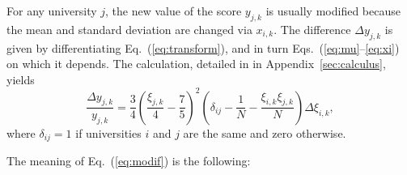 \documentclass[twocolumn]{article}
\def\eqref#1{Eq.~(\ref{eq:#1})}
\def\eqsref#1#2{Eqs.~(\ref{eq:#1}--\ref{eq:#2})}
\begin{document}
For any university $j$, the new value of the score $y_{j,k}$ is usually modified because the mean and standard deviation are changed via $x_{i,k}$.  The difference $\Delta y_{j,k}$ is given by differentiating \eqref{transform}, and in turn \eqsref{mu}{xi} on which it depends.
The calculation, detailed in  in Appendix~\ref{sec:calculus}, yields
\begin{equation}
    \frac{\Delta y_{j,k}}{y_{j,k}} = 
        \frac34 \left(\frac{\xi_{j,k}}4 -  \frac75\right)^2 
        \left(
            \delta_{ij} 
          - \frac 1N - \frac{\xi_{i,k}\xi_{j,k}}{N}
        \right)
        \Delta \xi_{i,k},
        \label{eq:modif}
\end{equation}
where $\delta_{ij} = 1$ if universities $i$ and $j$ are the same and zero otherwise.

The meaning of \eqref{modif} is the following:
\end{document}

